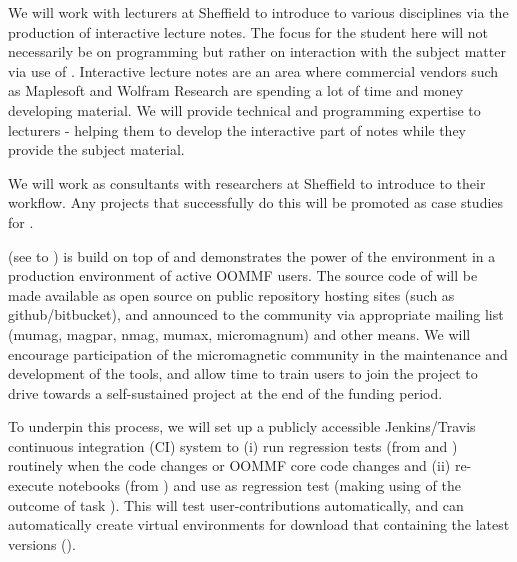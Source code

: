 \begin{workpackage}
\begin{tasklist}
\begin{task}[title=Introduce \TheProject to researchers and teachers]
We will work with lecturers at Sheffield to introduce \TheProject to various disciplines via the production of interactive lecture notes. The focus for the student here will not necessarily be on programming but rather on interaction with the subject matter via use of \TheProject. Interactive lecture notes are an area where commercial vendors such as Maplesoft and Wolfram Research are spending a lot of time and money developing material. We will provide technical and programming expertise to lecturers - helping them to develop the interactive part of notes while they provide the subject material.

We will work as consultants with researchers at Sheffield to introduce \TheProject to their workflow. Any projects that successfully do this will be promoted as case studies for \TheProject.
\end{task}

\begin{task}[id=dissemination-of-oommf-nb-virtual-environment,
  title=Demonstrator: Open source dissemination of \OOMMFNB{} virtual environment,
  lead=USO,PM=5]
  \OOMMFNB{} (see  to
  ) is build on top of \TheProject and demonstrates the power
  of the environment in a production environment of active OOMMF users. 
  The source code of \OOMMFNB{} will be made available as open source on
  public repository hosting sites (such as github/bitbucket), and
  announced to the community via appropriate mailing list (mumag,
  magpar, nmag, mumax, micromagnum) and other means. We will
  encourage participation of the micromagnetic community in the
  maintenance and development of the tools, and allow time to train
  users to join the \OOMMFNB{} project to drive towards a self-sustained
  \OOMMFNB{} project at the end of the funding period.

  To underpin this process, we will set up a publicly accessible
  Jenkins/Travis continuous integration (CI) system to (i) run
  regression tests (from  and ) routinely when the
  \OOMMFNB{} code changes or OOMMF core code changes and (ii)
  re-execute notebooks (from
  ) and use
  as regression test (making using of the outcome of task ). This will
  test user-contributions automatically, and can automatically create virtual environments
  for download that containing the latest versions ().


\end{task}
\end{tasklist}
\end{workpackage}
